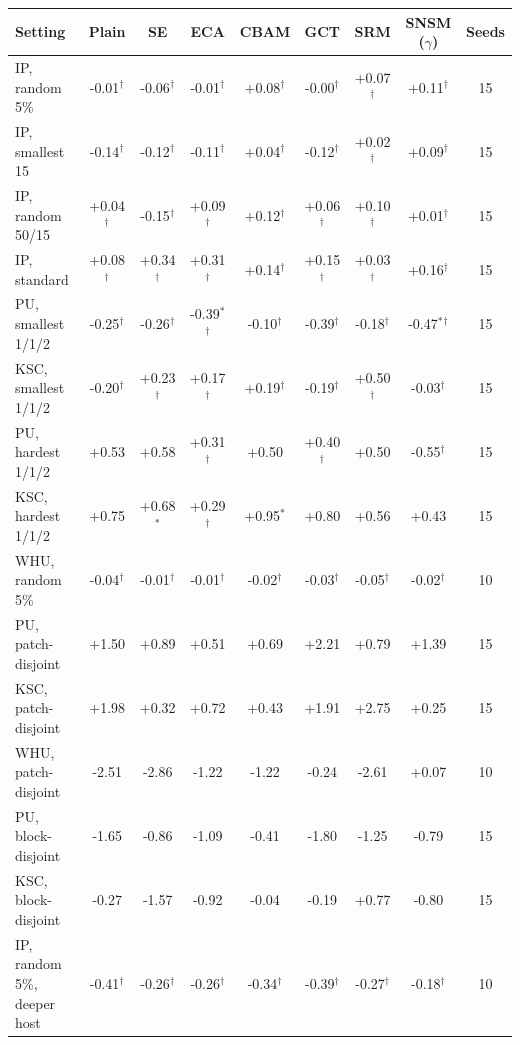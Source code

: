 \begin{tabular}{lcccccccc}
\toprule
Setting & Plain & SE & ECA & CBAM & GCT & SRM & SNSM ($\gamma$) & Seeds \\
\midrule
IP, random 5\% & -0.01$^{\dagger}$ & -0.06$^{\dagger}$ & -0.01$^{\dagger}$ & +0.08$^{\dagger}$ & -0.00$^{\dagger}$ & +0.07$^{\dagger}$ & +0.11$^{\dagger}$ & 15 \\
IP, smallest 15 & -0.14$^{\dagger}$ & -0.12$^{\dagger}$ & -0.11$^{\dagger}$ & +0.04$^{\dagger}$ & -0.12$^{\dagger}$ & +0.02$^{\dagger}$ & +0.09$^{\dagger}$ & 15 \\
IP, random 50/15 & +0.04$^{\dagger}$ & -0.15$^{\dagger}$ & +0.09$^{\dagger}$ & +0.12$^{\dagger}$ & +0.06$^{\dagger}$ & +0.10$^{\dagger}$ & +0.01$^{\dagger}$ & 15 \\
IP, standard & +0.08$^{\dagger}$ & +0.34$^{\dagger}$ & +0.31$^{\dagger}$ & +0.14$^{\dagger}$ & +0.15$^{\dagger}$ & +0.03$^{\dagger}$ & +0.16$^{\dagger}$ & 15 \\
\midrule
PU, smallest 1/1/2 & -0.25$^{\dagger}$ & -0.26$^{\dagger}$ & -0.39$^{*}$$^{\dagger}$ & -0.10$^{\dagger}$ & -0.39$^{\dagger}$ & -0.18$^{\dagger}$ & -0.47$^{*}$$^{\dagger}$ & 15 \\
KSC, smallest 1/1/2 & -0.20$^{\dagger}$ & +0.23$^{\dagger}$ & +0.17$^{\dagger}$ & +0.19$^{\dagger}$ & -0.19$^{\dagger}$ & +0.50$^{\dagger}$ & -0.03$^{\dagger}$ & 15 \\
PU, hardest 1/1/2 & +0.53 & +0.58 & +0.31$^{\dagger}$ & +0.50 & +0.40$^{\dagger}$ & +0.50 & -0.55$^{\dagger}$ & 15 \\
KSC, hardest 1/1/2 & +0.75 & +0.68$^{*}$ & +0.29$^{\dagger}$ & +0.95$^{*}$ & +0.80 & +0.56 & +0.43 & 15 \\
\midrule
WHU, random 5\% & -0.04$^{\dagger}$ & -0.01$^{\dagger}$ & -0.01$^{\dagger}$ & -0.02$^{\dagger}$ & -0.03$^{\dagger}$ & -0.05$^{\dagger}$ & -0.02$^{\dagger}$ & 10 \\
PU, patch-disjoint & +1.50 & +0.89 & +0.51 & +0.69 & +2.21 & +0.79 & +1.39 & 15 \\
KSC, patch-disjoint & +1.98 & +0.32 & +0.72 & +0.43 & +1.91 & +2.75 & +0.25 & 15 \\
WHU, patch-disjoint & -2.51 & -2.86 & -1.22 & -1.22 & -0.24 & -2.61 & +0.07 & 10 \\
PU, block-disjoint & -1.65 & -0.86 & -1.09 & -0.41 & -1.80 & -1.25 & -0.79 & 15 \\
KSC, block-disjoint & -0.27 & -1.57 & -0.92 & -0.04 & -0.19 & +0.77 & -0.80 & 15 \\
\midrule
IP, random 5\%, deeper host & -0.41$^{\dagger}$ & -0.26$^{\dagger}$ & -0.26$^{\dagger}$ & -0.34$^{\dagger}$ & -0.39$^{\dagger}$ & -0.27$^{\dagger}$ & -0.18$^{\dagger}$ & 10 \\

\end{tabular}
